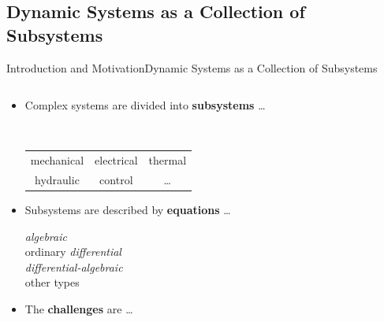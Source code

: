 \subsection{Dynamic Systems as a Collection of Subsystems}

\begin{frame}{Introduction and Motivation}{Dynamic Systems as a Collection of Subsystems}
  \begin{columns}
    \begin{column}[c]{0.6\textwidth}
      \begin{itemize}
        \item<1-> Complex systems are divided into \textbf{subsystems} \dots \\
        \begin{small}
          \quad\, \begin{tabular}{ccc}
            \raisebox{-1pt}{\scalebox{0.8}{\textcolor{fg_sl_color}{\faCogs}}} mechanical &
            \raisebox{-1pt}{\scalebox{0.8}{\textcolor{fg_sl_color}{\faBolt}}} electrical &
            \raisebox{-1pt}{\scalebox{0.8}{\textcolor{fg_sl_color}{\faFire}}} thermal \\
            \raisebox{-1pt}{\scalebox{0.8}{\textcolor{fg_sl_color}{\faOilCan}}} hydraulic &
            \raisebox{-1pt}{\scalebox{0.8}{\textcolor{fg_sl_color}{\faWaveSquare}}} control & \dots
          \end{tabular}
        \end{small}
        \item<2-> Subsystems are described by \textbf{equations} \dots \\
        \begin{small}
          \qquad \emph{algebraic} \\
          \qquad ordinary \emph{differential} \\
          \qquad \emph{differential-algebraic} \\
          \qquad other types
        \end{small}
        \item<3-> The \textbf{challenges} are \dots {}
      \end{itemize}
    \end{column}
    \begin{column}[c]{0.4\textwidth}
      \centering
    \end{column}
  \end{columns}
\end{frame}

